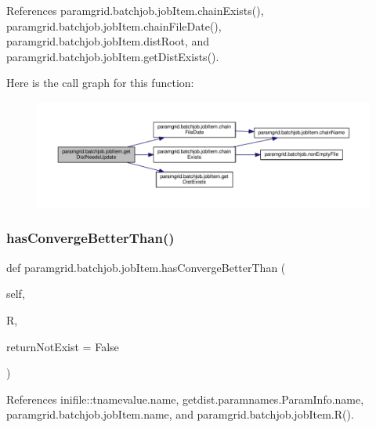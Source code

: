 References paramgrid.\+batchjob.\+job\+Item.\+chain\+Exists(), paramgrid.\+batchjob.\+job\+Item.\+chain\+File\+Date(), paramgrid.\+batchjob.\+job\+Item.\+dist\+Root, and paramgrid.\+batchjob.\+job\+Item.\+get\+Dist\+Exists().

Here is the call graph for this function\+:
\nopagebreak
\begin{figure}[H]
\begin{center}
\leavevmode
\includegraphics[width=350pt]{classparamgrid_1_1batchjob_1_1jobItem_a34d9ff5d01cecc89dcd1ce1a2d71a63e_cgraph}
\end{center}
\end{figure}
\mbox{\label{classparamgrid_1_1batchjob_1_1jobItem_a3cb0464ed8b1746556b0cfdb513f6fa4}} 
\subsubsection{\texorpdfstring{has\+Converge\+Better\+Than()}{hasConvergeBetterThan()}}
{\footnotesize\ttfamily def paramgrid.\+batchjob.\+job\+Item.\+has\+Converge\+Better\+Than (\begin{DoxyParamCaption}\item[{}]{self,  }\item[{}]{R,  }\item[{}]{return\+Not\+Exist = {\ttfamily False} }\end{DoxyParamCaption})}



References inifile\+::tnamevalue.\+name, getdist.\+paramnames.\+Param\+Info.\+name, paramgrid.\+batchjob.\+job\+Item.\+name, and paramgrid.\+batchjob.\+job\+Item.\+R().

